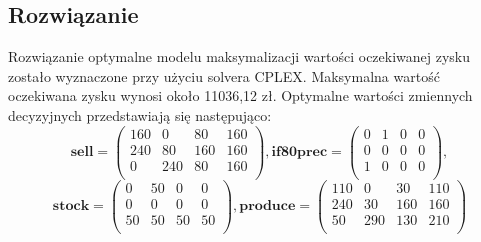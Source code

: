 \subsection{Rozwiązanie}
Rozwiązanie optymalne modelu maksymalizacji wartości oczekiwanej zysku zostało wyznaczone przy użyciu solvera CPLEX. 
Maksymalna wartość oczekiwana zysku wynosi około 11036,12 zł. 
Optymalne wartości zmiennych decyzyjnych przedstawiają się następująco:
\begin{displaymath}
\mathbf{sell} = 
 \begin{pmatrix}
  160 & 0 & 80 & 160 \\
  240 & 80 & 160 & 160 \\ 
  0 & 240 & 80 & 160 \\  
 \end{pmatrix},
 \mathbf{if80prec} = 
 \begin{pmatrix}
  0 & 1 & 0 & 0 \\
  0 & 0 & 0 & 0 \\ 
  1 & 0 & 0 & 0 \\  
 \end{pmatrix},
\end{displaymath}
\begin{displaymath}
\mathbf{stock} = 
 \begin{pmatrix}
  0 & 50 & 0 & 0 \\
  0 & 0 & 0 & 0 \\ 
  50 & 50 & 50 & 50 \\  
 \end{pmatrix},
 \mathbf{produce} = 
 \begin{pmatrix}
  110 & 0 & 30 & 110 \\
  240 & 30 & 160 & 160 \\ 
  50 & 290 & 130 & 210 \\  
 \end{pmatrix} 
\end{displaymath}

